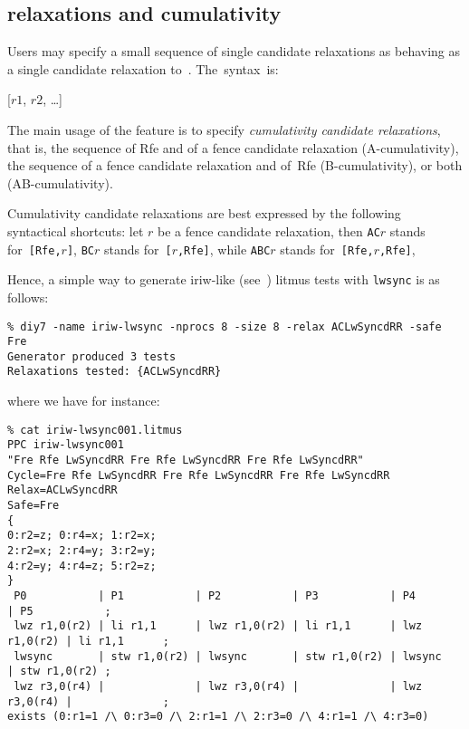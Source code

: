\subsection{\label{composite:sec} relaxations and cumulativity}
Users may specify a small sequence of single candidate relaxations
as behaving as a single candidate relaxation to~\diy. The~syntax~is:
\begin{center}
[$r1$, $r2$, \ldots]
\end{center}
The main usage of the feature is to specify
\emph{cumulativity candidate relaxations},
that is, the sequence of Rfe and of a fence candidate relaxation
(A-cumulativity),
the sequence of a fence candidate relaxation and of~Rfe (B-cumulativity),
or both (AB-cumulativity).

Cumulativity candidate relaxations are best expressed by the following
syntactical shortcuts:
let $r$ be a fence candidate relaxation, then
\texttt{AC}$r$ stands for~\texttt{[Rfe,}$r$\texttt{]},
\texttt{BC}$r$ stands for~\texttt{[}$r$\texttt{,Rfe]},
while \texttt{ABC}$r$ stands for~\texttt{[Rfe,}$r$\texttt{,Rfe]},

Hence, a simple way to generate iriw-like (see~\mysec{\ref{iriw}})
litmus tests  with \texttt{lwsync} is as follows:
\begin{verbatim}
% diy7 -name iriw-lwsync -nprocs 8 -size 8 -relax ACLwSyncdRR -safe Fre
Generator produced 3 tests
Relaxations tested: {ACLwSyncdRR}
\end{verbatim}
where we have for instance:
\begin{verbatim}
% cat iriw-lwsync001.litmus
PPC iriw-lwsync001
"Fre Rfe LwSyncdRR Fre Rfe LwSyncdRR Fre Rfe LwSyncdRR"
Cycle=Fre Rfe LwSyncdRR Fre Rfe LwSyncdRR Fre Rfe LwSyncdRR
Relax=ACLwSyncdRR
Safe=Fre
{
0:r2=z; 0:r4=x; 1:r2=x;
2:r2=x; 2:r4=y; 3:r2=y;
4:r2=y; 4:r4=z; 5:r2=z;
}
 P0           | P1           | P2           | P3           | P4           | P5           ;
 lwz r1,0(r2) | li r1,1      | lwz r1,0(r2) | li r1,1      | lwz r1,0(r2) | li r1,1      ;
 lwsync       | stw r1,0(r2) | lwsync       | stw r1,0(r2) | lwsync       | stw r1,0(r2) ;
 lwz r3,0(r4) |              | lwz r3,0(r4) |              | lwz r3,0(r4) |              ;
exists (0:r1=1 /\ 0:r3=0 /\ 2:r1=1 /\ 2:r3=0 /\ 4:r1=1 /\ 4:r3=0)
\end{verbatim}

